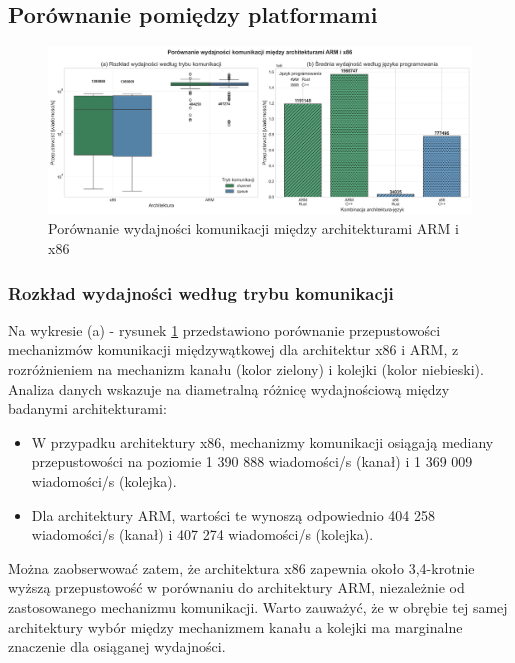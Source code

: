 \subsection{Porównanie pomiędzy platformami}
\begin{figure}[H]
    \centering
    \includegraphics[width=\textwidth]{analiza/images/conc/pc/compare/rysunek_1_porownanie_wydajnosci.png}
    \caption{Porównanie wydajności komunikacji między architekturami ARM i x86}
    \label{rysunek_1_porownanie_wydajnosci}
\end{figure}
\subsubsection{Rozkład wydajności według trybu komunikacji}
Na wykresie (a) - rysunek \ref{rysunek_1_porownanie_wydajnosci} przedstawiono porównanie przepustowości mechanizmów komunikacji międzywątkowej dla architektur x86 i ARM, z rozróżnieniem na mechanizm kanału (kolor zielony) i kolejki (kolor niebieski). Analiza danych wskazuje na diametralną różnicę wydajnościową między badanymi architekturami:
\begin{itemize}
    \item W przypadku architektury x86, mechanizmy komunikacji osiągają mediany przepustowości na poziomie 1 390 888 wiadomości/s (kanał) i 1 369 009 wiadomości/s (kolejka).
    \item Dla architektury ARM, wartości te wynoszą odpowiednio 404 258 wiadomości/s (kanał) i 407 274 wiadomości/s (kolejka).
\end{itemize}

Można zaobserwować zatem, że architektura x86 zapewnia około 3,4-krotnie wyższą przepustowość w porównaniu do architektury ARM, niezależnie od zastosowanego mechanizmu komunikacji. Warto zauważyć, że w obrębie tej samej architektury wybór między mechanizmem kanału a kolejki ma marginalne znaczenie dla osiąganej wydajności.

